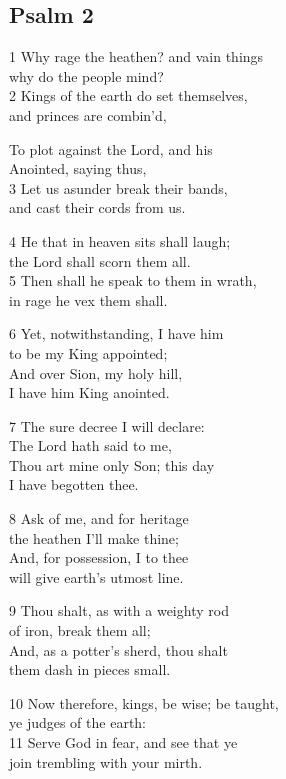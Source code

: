 \begin{multicols}{3}
\subsection*{Psalm 2 }

1 Why rage the heathen? and vain things\\
why do the people mind?\\
2 Kings of the earth do set themselves,\\
and princes are combin’d,

To plot against the Lord, and his\\
Anointed, saying thus,\\
3 Let us asunder break their bands,\\
and cast their cords from us.

4 He that in heaven sits shall laugh;\\
the Lord shall scorn them all.\\
5 Then shall he speak to them in wrath,\\
in rage he vex them shall.

6 Yet, notwithstanding, I have him\\
to be my King appointed;\\
And over Sion, my holy hill,\\
I have him King anointed.

7 The sure decree I will declare:\\
The Lord hath said to me,\\
Thou art mine only Son; this day\\
I have begotten thee.

8 Ask of me, and for heritage\\
the heathen I’ll make thine;\\
And, for possession, I to thee\\
will give earth’s utmost line.

9 Thou shalt, as with a weighty rod\\
of iron, break them all;\\
And, as a potter’s sherd, thou shalt\\
them dash in pieces small.

10 Now therefore, kings, be wise; be taught, \\
ye judges of the earth:\\
11 Serve God in fear, and see that ye\\
join trembling with your mirth.


\end{multicols}
